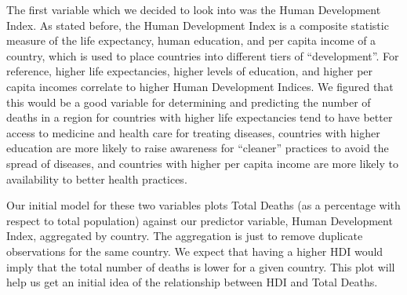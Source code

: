 \documentclass[
  12pt,
]{article}
\begin{document}
The first variable which we decided to look into was the Human
Development Index. As stated before, the Human Development Index is a
composite statistic measure of the life expectancy, human education, and
per capita income of a country, which is used to place countries into
different tiers of ``development''. For reference, higher life
expectancies, higher levels of education, and higher per capita incomes
correlate to higher Human Development Indices. We figured that this
would be a good variable for determining and predicting the number of
deaths in a region for countries with higher life expectancies tend to
have better access to medicine and health care for treating diseases,
countries with higher education are more likely to raise awareness for
``cleaner'' practices to avoid the spread of diseases, and countries
with higher per capita income are more likely to availability to better
health practices.

Our initial model for these two variables plots Total Deaths (as a
percentage with respect to total population) against our predictor
variable, Human Development Index, aggregated by country. The
aggregation is just to remove duplicate observations for the same
country. We expect that having a higher HDI would imply that the total
number of deaths is lower for a given country. This plot will help us
get an initial idea of the relationship between HDI and Total Deaths.
\end{document}
